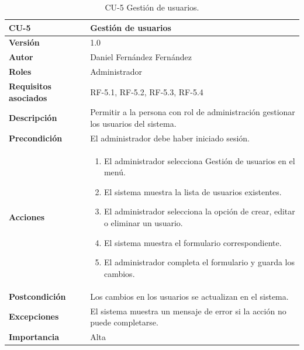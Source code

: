 \begin{table}[p]
        \centering
        \begin{tabularx}{\linewidth}{ p{} p{} }
            \toprule
            \textbf{CU-5} & \textbf{Gestión de usuarios}\\
            \toprule
            \textbf{Versión} & 1.0 \\
            \textbf{Autor} & Daniel Fernández Fernández \\
            \textbf{Roles} & Administrador \\
            \textbf{Requisitos asociados} & RF-5.1, RF-5.2, RF-5.3, RF-5.4 \\
            \textbf{Descripción} & Permitir a la persona con rol de administración gestionar los usuarios del sistema. \\
            \textbf{Precondición} & El administrador debe haber iniciado sesión. \\
            \textbf{Acciones} &
            \begin{enumerate}
            \def\labelenumi{\arabic{enumi}.}
            \tightlist
            \item El administrador selecciona Gestión de usuarios en el menú.
            \item El sistema muestra la lista de usuarios existentes.
            \item El administrador selecciona la opción de crear, editar o eliminar un usuario.
            \item El sistema muestra el formulario correspondiente.
            \item El administrador completa el formulario y guarda los cambios.
            \end{enumerate}\\
            \textbf{Postcondición} & Los cambios en los usuarios se actualizan en el sistema. \\
            \textbf{Excepciones} & El sistema muestra un mensaje de error si la acción no puede completarse. \\
            \textbf{Importancia} & Alta \\
            \bottomrule
        \end{tabularx}
        \caption{CU-5 Gestión de usuarios.}
\end{table}

